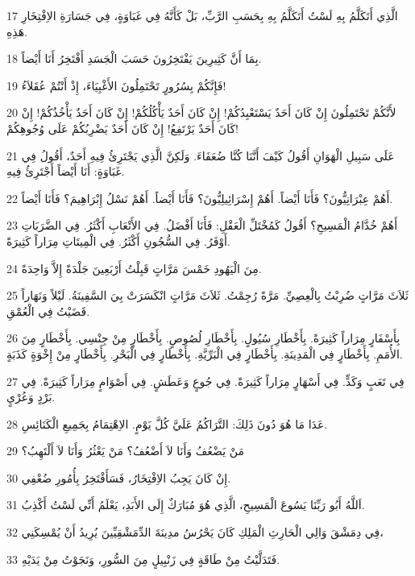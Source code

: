 \par 17 الَّذِي أَتَكَلَّمُ بِهِ لَسْتُ أَتَكَلَّمُ بِهِ بِحَسَبِ الرَّبِّ، بَلْ كَأَنَّهُ فِي غَبَاوَةٍ، فِي جَسَارَةِ الاِفْتِخَارِ هَذِهِ.
\par 18 بِمَا أَنَّ كَثِيرِينَ يَفْتَخِرُونَ حَسَبَ الْجَسَدِ أَفْتَخِرُ أَنَا أَيْضاً.
\par 19 فَإِنَّكُمْ بِسُرُورٍ تَحْتَمِلُونَ الأَغْبِيَاءَ، إِذْ أَنْتُمْ عُقَلاَءُ!
\par 20 لأَنَّكُمْ تَحْتَمِلُونَ إِنْ كَانَ أَحَدٌ يَسْتَعْبِدُكُمْ! إِنْ كَانَ أَحَدٌ يَأْكُلُكُمْ! إِنْ كَانَ أَحَدٌ يَأْخُذُكُمْ! إِنْ كَانَ أَحَدٌ يَرْتَفِعُ! إِنْ كَانَ أَحَدٌ يَضْرِبُكُمْ عَلَى وُجُوهِكُمْ!
\par 21 عَلَى سَبِيلِ الْهَوَانِ أَقُولُ كَيْفَ أَنَّنَا كُنَّا ضُعَفَاءَ. وَلَكِنَّ الَّذِي يَجْتَرِئُ فِيهِ أَحَدٌ، أَقُولُ فِي غَبَاوَةٍ: أَنَا أَيْضاً أَجْتَرِئُ فِيهِ.
\par 22 أَهُمْ عِبْرَانِيُّونَ؟ فَأَنَا أَيْضاً. أَهُمْ إِسْرَائِيلِيُّونَ؟ فَأَنَا أَيْضاً. أَهُمْ نَسْلُ إِبْرَاهِيمَ؟ فَأَنَا أَيْضاً.
\par 23 أَهُمْ خُدَّامُ الْمَسِيحِ؟ أَقُولُ كَمُخْتَلِّ الْعَقْلِ: فَأَنَا أَفْضَلُ. فِي الأَتْعَابِ أَكْثَرُ. فِي الضَّرَبَاتِ أَوْفَرُ. فِي السُّجُونِ أَكْثَرُ. فِي الْمِيتَاتِ مِرَاراً كَثِيرَةً.
\par 24 مِنَ الْيَهُودِ خَمْسَ مَرَّاتٍ قَبِلْتُ أَرْبَعِينَ جَلْدَةً إِلاَّ وَاحِدَةً.
\par 25 ثَلاَثَ مَرَّاتٍ ضُرِبْتُ بِالْعِصِيِّ. مَرَّةً رُجِمْتُ. ثَلاَثَ مَرَّاتٍ انْكَسَرَتْ بِيَ السَّفِينَةُ. لَيْلاً وَنَهَاراً قَضَيْتُ فِي الْعُمْقِ.
\par 26 بِأَسْفَارٍ مِرَاراً كَثِيرَةً. بِأَخْطَارِ سُيُولٍ. بِأَخْطَارِ لُصُوصٍ. بِأَخْطَارٍ مِنْ جِنْسِي. بِأَخْطَارٍ مِنَ الأُمَمِ. بِأَخْطَارٍ فِي الْمَدِينَةِ. بِأَخْطَارٍ فِي الْبَرِّيَّةِ. بِأَخْطَارٍ فِي الْبَحْرِ. بِأَخْطَارٍ مِنْ إِخْوَةٍ كَذَبَةٍ.
\par 27 فِي تَعَبٍ وَكَدٍّ. فِي أَسْهَارٍ مِرَاراً كَثِيرَةً. فِي جُوعٍ وَعَطَشٍ. فِي أَصْوَامٍ مِرَاراً كَثِيرَةً. فِي بَرْدٍ وَعُرْيٍ.
\par 28 عَدَا مَا هُوَ دُونَ ذَلِكَ: التَّرَاكُمُ عَلَيَّ كُلَّ يَوْمٍ. الاِهْتِمَامُ بِجَمِيعِ الْكَنَائِسِ.
\par 29 مَنْ يَضْعُفُ وَأَنَا لاَ أَضْعُفُ؟ مَنْ يَعْثُرُ وَأَنَا لاَ أَلْتَهِبُ؟
\par 30 إِنْ كَانَ يَجِبُ الاِفْتِخَارُ، فَسَأَفْتَخِرُ بِأُمُورِ ضُعْفِي.
\par 31 اَللَّهُ أَبُو رَبِّنَا يَسُوعَ الْمَسِيحِ، الَّذِي هُوَ مُبَارَكٌ إِلَى الأَبَدِ، يَعْلَمُ أَنِّي لَسْتُ أَكْذِبُ.
\par 32 فِي دِمَشْقَ وَالِي الْحَارِثِ الْمَلِكِ كَانَ يَحْرُسُ مدِينَةَ الدِّمَشْقِيِّينَ يُرِيدُ أَنْ يُمْسِكَنِي،
\par 33 فَتَدَلَّيْتُ مِنْ طَاقَةٍ فِي زَنْبِيلٍ مِنَ السُّورِ، وَنَجَوْتُ مِنْ يَدَيْهِ.

